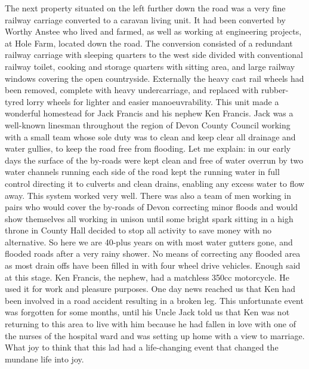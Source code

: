 The next property situated on the left further down the road was a very fine
railway carriage converted to a caravan living unit. It had been converted by
Worthy Anstee who lived and farmed, as well as working at engineering projects,
at Hole Farm, located down the road. The conversion consisted of a redundant
railway carriage with sleeping quarters to the west side divided with
conventional railway toilet, cooking and storage quarters with sitting area,
and large railway windows covering the open countryside. Externally the heavy
cast rail wheels had been removed, complete with heavy undercarriage, and
replaced with rubber-tyred lorry wheels for lighter and easier manoeuvrability.
This unit made a wonderful homestead for Jack Francis and his nephew Ken
Francis. Jack was a well-known linesman throughout the region of Devon County
Council working with a small team whose sole duty was to clean and keep clear
all drainage and water gullies, to keep the road free from flooding. Let me
explain: in our early days the surface of the by-roads were kept clean and free
of water overrun by two water channels running each side of the road kept the
running water in full control directing it to culverts and clean drains,
enabling any excess water to flow away. This system worked very well. There was
also a team of men working in pairs who would cover the by-roads of Devon
correcting minor floods and would show themselves all working in unison until
some bright spark sitting in a high throne in County Hall decided to stop all
activity to save money with no alternative. So here we are 40-plus years on
with most water gutters gone, and flooded roads after a very rainy shower. No
means of correcting any flooded area as most drain offs have been filled in
with four wheel drive vehicles. Enough said at this stage. Ken Francis, the
nephew, had a matchless 350cc motorcycle. He used it for work and pleasure
purposes. One day news reached us that Ken had been involved in a road accident
resulting in a broken leg. This unfortunate event was forgotten for some months,
until his Uncle Jack told us that Ken was not returning to this area to live
with him because he had fallen in love with one of the nurses of the hospital
ward and was setting up home with a view to marriage. What joy to think that
this lad had a life-changing event that changed the mundane life into joy.

